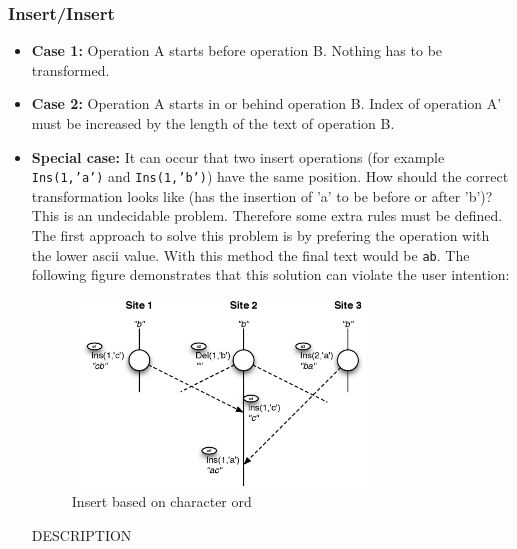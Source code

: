 \subsubsection{Insert/Insert}
\begin{itemize}
\item \textbf{Case 1:}
Operation A starts before operation B. Nothing has to be transformed.
\item \textbf{Case 2:}
Operation A starts in or behind operation B. Index of operation A' must be increased by the length of the text of operation B.
\item \textbf{Special case:}
It can occur that two insert operations (for example \texttt{Ins(1,'a')} and \texttt{Ins(1,'b')}) have the same position. How should the correct transformation looks like (has the insertion of 'a' to be before or after 'b')? This is an undecidable problem. Therefore some extra rules must be defined. The first approach to solve this problem is by prefering the operation with the lower ascii value. With this method the final text would be \texttt{ab}. The following figure demonstrates that this solution can violate the user intention:
\begin{figure}[H]
\centering
\includegraphics[height=5cm,width=8cm]{../../images/algo-impl/transform_ins_ins_char.eps}
\caption{Insert based on character ord}
\label{Insert based on character ord}
\end{figure}
DESCRIPTION


\end{itemize}
